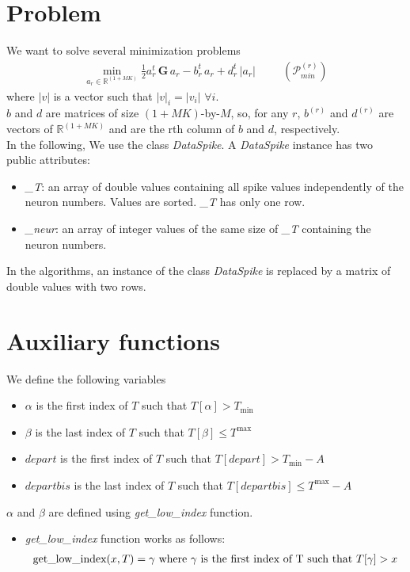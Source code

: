 \documentclass{article}
\newcommand{\be}{\begin{eqnarray*}}
\newcommand{\ee}{\end{eqnarray*}}
\newcommand{\dsp}{\displaystyle}
\def\R{\mathbb{R}}
\def\Tmin{T_{\min}}
\def\Tmax{T^{\max}}
\begin{document}
\section{Problem}
We want to solve several minimization problems
\be
\min_{a_r\in\R^{(1+MK)}} \dsp\frac{1}{2}a_r^t\,\mathbf{G}\,a_r-b_r^t\,a_r+d_r^t\,|a_r| \ \ \quad \quad (\mathcal{P}_{min}^{(r)})
\ee
where $|v|$ is a vector such that $|v|_i=|v_i|\, \, \forall i$.\\
$b$ and $d$ are matrices of size $(1+MK)$-by-$M$, so, for any $r$, $b^{(r)}$ and $d^{(r)}$ are vectors of $\R^{(1+MK)}$ and are the rth column of $b$ and $d$, respectively.\\
In the following, We use the class \textit{DataSpike}. A \textit{DataSpike} instance has two public attributes:
\begin{itemize}
\item \textit{\_T}: an array of double values containing all spike values independently of the neuron numbers. Values are sorted. \textit{\_T} has only one row.
\item \textit{\_neur}: an array of integer values of the same size of \textit{\_T} containing the neuron numbers.
\end{itemize}
In the algorithms, an instance of the class \textit{DataSpike} is replaced by a matrix of double values with two rows.

\section{Auxiliary functions}
We define the following variables
\begin{itemize}
\item $\alpha$ is the first index of $T$ such that $T[\alpha]> \Tmin$
\item $\beta$ is the last index of $T$ such that $T[\beta]\leq \Tmax$
\item $depart$ is the first index of $T$ such that $T[depart]> \Tmin-A$
\item $departbis$ is the last index of $T$ such that $T[departbis]\leq \Tmax-A$
\end{itemize}
$\alpha$ and $\beta$ are defined using \textit{get\_low\_index} function.
\begin{itemize}
\item \textit{get\_low\_index} function works as follows:
\be
\hbox{get\_low\_index}(x, T) = \gamma \hbox{ where } \gamma \hbox{ is the first index of T such that }T[\gamma]> x 
\ee
\end{itemize}
\end{document}

